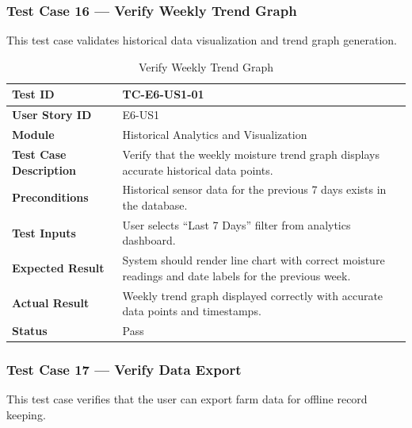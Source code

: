 \subsubsection{Test Case 16 --- Verify Weekly Trend Graph}

This test case validates historical data visualization and trend 
graph generation.

\begin{longtable}{|p{4cm}|p{8cm}|}
\caption{Verify Weekly Trend Graph}
\label{tab:tc_trend} \\
\hline
\textbf{Test ID} & TC-E6-US1-01 \\ \hline
\textbf{User Story ID} & E6-US1 \\ \hline
\textbf{Module} & Historical Analytics and Visualization \\ \hline
\textbf{Test Case Description} & Verify that the weekly moisture 
trend graph displays accurate historical data points. \\ \hline
\textbf{Preconditions} & Historical sensor data for the previous 
7 days exists in the database. \\ \hline
\textbf{Test Inputs} & User selects ``Last 7 Days'' filter from 
analytics dashboard. \\ \hline
\textbf{Expected Result} & System should render line chart with 
correct moisture readings and date labels for the previous week. \\ 
\hline
\textbf{Actual Result} & Weekly trend graph displayed correctly 
with accurate data points and timestamps. \\ \hline
\textbf{Status} & Pass \\ \hline
\end{longtable}

\subsubsection{Test Case 17 --- Verify Data Export}

This test case verifies that the user can export farm data for 
offline record keeping.

